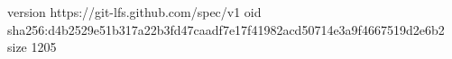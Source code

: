 version https://git-lfs.github.com/spec/v1
oid sha256:d4b2529e51b317a22b3fd47caadf7e17f41982acd50714e3a9f4667519d2e6b2
size 1205
